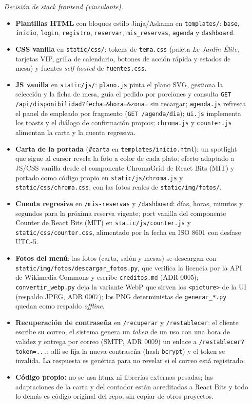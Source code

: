 \documentclass[12pt]{article}
\begin{document}
\noindent\textit{Decisión de stack frontend (vinculante).}
\begin{itemize}
  \item \textbf{Plantillas HTML} con bloques estilo Jinja/Askama en \texttt{templates/}: \texttt{base}, \texttt{inicio}, \texttt{login}, \texttt{registro}, \texttt{reservar}, \texttt{mis\_reservas}, \texttt{agenda} y \texttt{dashboard}.
  \item \textbf{CSS vanilla} en \texttt{static/css/}: tokens de \texttt{tema.css} (paleta \textit{Le Jardin Élite}, tarjetas VIP, grilla de calendario, botones de acción rápida y estados de mesa) y fuentes \textit{self-hosted} de \texttt{fuentes.css}.
  \item \textbf{JS vanilla} en \texttt{static/js/}: \texttt{plano.js} pinta el plano SVG, gestiona la selección y la ficha de mesa, guía el pedido por porciones y consulta \texttt{GET /api/disponibilidad?fecha=\&hora=\&zona=} sin recargar; \texttt{agenda.js} refresca el panel de empleado por fragmento (\texttt{GET /agenda/dia}); \texttt{ui.js} implementa los toasts y el diálogo de confirmación propios; \texttt{chroma.js} y \texttt{counter.js} alimentan la carta y la cuenta regresiva.
  \item \textbf{Carta de la portada} (\texttt{\#carta} en \texttt{templates/inicio.html}): un spotlight que sigue al cursor revela la foto a color de cada plato; efecto adaptado a JS/CSS vanilla desde el componente ChromaGrid de React Bits (MIT) y portado como código propio en \texttt{static/js/chroma.js} y \texttt{static/css/chroma.css}, con las fotos reales de \texttt{static/img/fotos/}.
  \item \textbf{Cuenta regresiva} en \texttt{/mis-reservas} y \texttt{/dashboard}: días, horas, minutos y segundos para la próxima reserva vigente; port vanilla del componente Counter de React Bits (MIT) en \texttt{static/js/counter.js} y \texttt{static/css/counter.css}, alimentado por la fecha en ISO 8601 con desfase UTC-5.
  \item \textbf{Fotos del menú}: las fotos (carta, salón y mesas) se descargan con \texttt{static/img/fotos/descargar\_fotos.py}, que verifica la licencia por la API de Wikimedia Commons y escribe \texttt{creditos.md} (ADR 0005); \texttt{convertir\_webp.py} deja la variante WebP que sirven los \texttt{<picture>} de la UI (respaldo JPEG, ADR 0007); los PNG deterministas de \texttt{generar\_*.py} quedan como respaldo \textit{offline}.
  \item \textbf{Recuperaci\'on de contrase{\~n}a} en \texttt{/recuperar} y \texttt{/restablecer}: el cliente escribe su correo, el sistema genera un \textit{token} de un uso con una hora de validez y entrega por correo (SMTP, ADR 0009) un enlace a \texttt{/restablecer?token=...}; all\'i se fija la nueva contrase{\~n}a (hash \texttt{bcrypt}) y el token se invalida. La respuesta es gen\'erica para no revelar si el correo est\'a registrado. \item \textbf{C\'odigo propio:} no se usa htmx ni librerías externas pesadas; las adaptaciones de la carta y del contador están acreditadas a React Bits y todo lo demás es código original del repo, sin copiar de otros proyectos.
\end{itemize}
\end{document}
